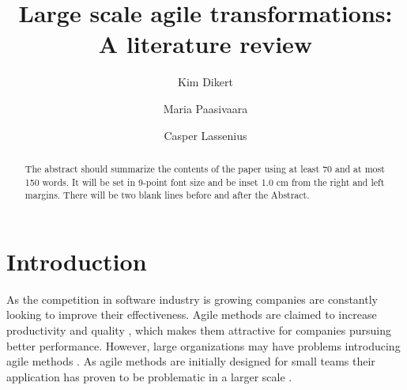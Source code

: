 \documentclass[lnbip]{svmultln}
\begin{document}

\mainmatter

\title{Large scale agile transformations: A literature review}


\author{Kim Dikert \and Maria Paasivaara \and Casper Lassenius}



\maketitle



\begin{abstract}        %
The abstract should summarize the contents of the paper
using at least 70 and at most 150 words. It will be set in 9-point
font size and be inset 1.0 cm from the right and left margins.
There will be two blank lines before and after the Abstract.
\end{abstract}


\section{Introduction}

As the competition in software industry is growing companies are constantly
looking to improve their effectiveness. Agile methods are claimed to increase
productivity and quality , which makes them attractive for
companies pursuing better performance. However, large organizations may have
problems introducing agile methods . As agile methods are
initially designed for small teams their application has proven to be
problematic in a larger scale .
\end{document}
